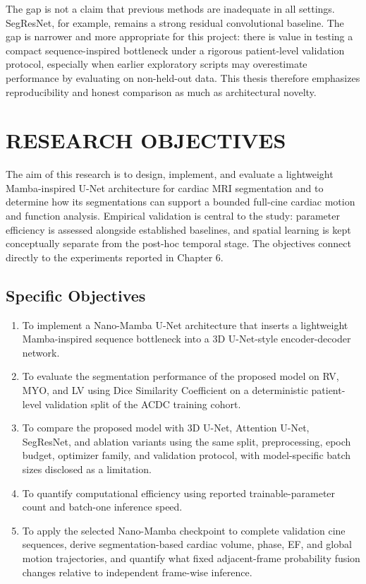 The gap is not a claim that previous methods are inadequate in all settings. SegResNet, for example, remains a strong residual convolutional baseline. The gap is narrower and more appropriate for this project: there is value in testing a compact sequence-inspired bottleneck under a rigorous patient-level validation protocol, especially when earlier exploratory scripts may overestimate performance by evaluating on non-held-out data. This thesis therefore emphasizes reproducibility and honest comparison as much as architectural novelty.

\chapter{RESEARCH OBJECTIVES}
\label{chap:objectives}

The aim of this research is to design, implement, and evaluate a lightweight Mamba-inspired U-Net architecture for cardiac MRI segmentation and to determine how its segmentations can support a bounded full-cine cardiac motion and function analysis. Empirical validation is central to the study: parameter efficiency is assessed alongside established baselines, and spatial learning is kept conceptually separate from the post-hoc temporal stage. The objectives connect directly to the experiments reported in Chapter 6.

\section{Specific Objectives}
\begin{enumerate}
    \item To implement a Nano-Mamba U-Net architecture that inserts a lightweight Mamba-inspired sequence bottleneck into a 3D U-Net-style encoder-decoder network.
    \item To evaluate the segmentation performance of the proposed model on RV, MYO, and LV using Dice Similarity Coefficient on a deterministic patient-level validation split of the ACDC training cohort.
    \item To compare the proposed model with 3D U-Net, Attention U-Net, SegResNet, and ablation variants using the same split, preprocessing, epoch budget, optimizer family, and validation protocol, with model-specific batch sizes disclosed as a limitation.
    \item To quantify computational efficiency using reported trainable-parameter count and batch-one inference speed.
    \item To apply the selected Nano-Mamba checkpoint to complete validation cine sequences, derive segmentation-based cardiac volume, phase, EF, and global motion trajectories, and quantify what fixed adjacent-frame probability fusion changes relative to independent frame-wise inference.
\end{enumerate}

